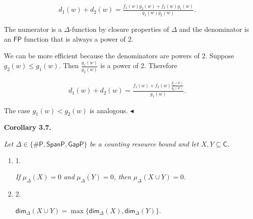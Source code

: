 \documentclass[10pt,a4paper]{article}
\begin{document}
\[\begin{gathered}
d_{1}(w)+d_{2}(w)=\frac{f_{1}(w)g_{2}(w)+f_{2}(w)g_{1}(w)}{g_{1}(w)g_{2}(w)}.
\end{gathered}\]


The numerator is a $\Delta$-function by closure properties of $\Delta$ and the denominator is an $\mathsf{FP}$
function that is always a power of 2.\par




We can be more efficient because the denominators are powers of $2$. Suppose $g_{2}(w)\leq g_{1}(w)$. Then $\frac{g_{1}(w)}{g_{2}(w)}$ is a power
of 2.
Therefore\par


\[\begin{gathered}
d_{1}(w)+d_{2}(w)=\frac{f_{1}(w)+f_{2}(w)\frac{g_{1}(w)}{g_{2}(w)}}{g_{1}(w)}.
\end{gathered}\]


The case $g_{1}(w)<g_{2}(w)$ is analogous.
$\blacktriangleleft$\par





\par\medskip\noindent\textbf{
\textbf{Corollary 3.7}\textbf{.}
}\par



\emph{Let $\Delta\in\{{\mathsf{\#}\mathsf{P}},\mathsf{SpanP},\mathsf{GapP}\}$ be a counting resource bound and let
$X,Y\subseteq\mathsf{C}$.}\par


\begin{enumerate}


\item[] 
1. 


\emph{If }$\mu_{\Delta}(X)=0$\emph{ and }$\mu_{\Delta}(Y)=0$\emph{, then }$\mu_{\Delta}(X\cup Y)=0.$\emph{}\par





\item[] 
2. 


${\mathsf{dim}}_{\Delta}(X\cup Y)=\max\{{\mathsf{dim}}_{\Delta}(X),{\mathsf{dim}}_{\Delta}(Y)\}.$\emph{}\par





\end{enumerate}
\end{document}

